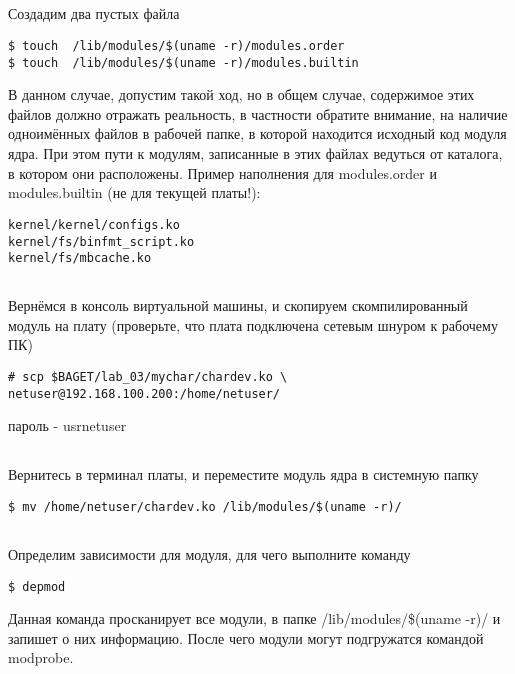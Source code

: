 \subsection{}Создадим два пустых файла
\begin{lstlisting}[style=bash]
$ touch  /lib/modules/$(uname -r)/modules.order
$ touch  /lib/modules/$(uname -r)/modules.builtin
\end{lstlisting}
В данном случае, допустим такой ход, но в общем случае, содержимое этих файлов должно отражать реальность, в частности обратите внимание, на наличие одноимённых файлов в рабочей папке, в которой находится исходный код модуля ядра. 
При этом пути к модулям, записанные в этих файлах ведуться от каталога, в котором они расположены.
Пример наполнения для modules.order и modules.builtin (не для текущей платы!):
\begin{lstlisting}[style=stdout]
kernel/kernel/configs.ko
kernel/fs/binfmt_script.ko
kernel/fs/mbcache.ko
\end{lstlisting}

\subsection{}Вернёмся в консоль виртуальной машины, и скопируем скомпилированный модуль на плату (проверьте, что плата подключена сетевым шнуром к рабочему ПК)
\begin{lstlisting}[style=bash]
# scp $BAGET/lab_03/mychar/chardev.ko \
netuser@192.168.100.200:/home/netuser/
\end{lstlisting}
пароль - usrnetuser

\subsection{}Вернитесь в терминал платы, и переместите модуль ядра в системную папку
\begin{lstlisting}[style=bash]
$ mv /home/netuser/chardev.ko /lib/modules/$(uname -r)/
\end{lstlisting}

\subsection{}Определим зависимости для модуля, для чего выполните команду 
\begin{lstlisting}[style=bash]
$ depmod
\end{lstlisting}
Данная команда просканирует все модули, в папке /lib/modules/\$(uname -r)/ и запишет о них информацию. После чего модули могут подгружатся командой modprobe. 

